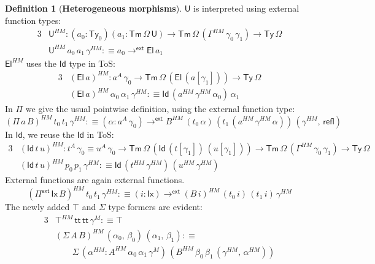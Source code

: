 \documentclass[12pt,a4paper,twoside,openany]{book}
\theoremstyle{remark}
\theoremstyle{definition}
\newtheorem{mydefinition}{Definition}
\theoremstyle{theorem}
\newcommand{\ms}[1]{\mathsf{#1}}
\newcommand{\refl}{\mathsf{refl}}
\newcommand{\Tm}{\mathsf{Tm}}
\newcommand{\Ty}{\mathsf{Ty}}
\newcommand{\U}{\mathsf{U}}
\newcommand{\El}{\mathsf{El}}
\newcommand{\Id}{\mathsf{Id}}
\renewcommand{\tt}{\mathsf{tt}}
\newcommand{\Pie}{\Pi^{\mathsf{ext}}}
\newcommand{\toe}{\to^{\ms{ext}}}
\newcommand{\defn}{:\equiv}
\begin{document}
\begin{mydefinition}[\textbf{Heterogeneous morphisms}]
\noindent $\U$ is interpreted using external function types:
\begin{alignat*}{3}
  & \U^{HM} : (a_0 : \Ty_0)(a_1 : \Tm\,\Omega\,\U) \to \Tm\,\Omega\,(\Gamma^{HM}\,\gamma_0\,\gamma_1)
  \to \Ty\,\Omega\\
  & \U^{HM}\,a_0\,a_1\,\gamma^{HM} \defn a_0 \toe \El\,a_1
\end{alignat*}
$\El^{HM}$ uses the $\Id$ type in ToS:
\begin{alignat*}{3}
  & (\El\,a)^{HM} : a^A\,\gamma_0 \to \Tm\,\Omega\,(\El\,(a[\gamma_1])) \to \Ty\,\Omega\\
  & (\El\,a)^{HM}\,\alpha_0\,\alpha_1\,\gamma^{HM} \defn \Id\,(a^{HM}\,\gamma^{HM}\,\alpha_0)\,\alpha_1
\end{alignat*}
In $\Pi$ we give the usual pointwise definition, using the external function type:
\[
  (\Pi\,a\,B)^{HM}\,t_0\,t_1\,\gamma^{HM} \defn (\alpha : a^A\,\gamma_0) \toe B^{HM}\,(t_0\,\alpha)\,(t_1\,(a^{HM}\,\gamma^{HM}\,\alpha))\,(\gamma^{HM},\,\refl)
\]
In $\Id$, we reuse the $\Id$ in ToS:
\begin{alignat*}{3}
  &(\Id\,t\,u)^{HM} : t^A\,\gamma_0 \equiv u^A\,\gamma_0 \to \Tm\,\Omega\,(\Id\,(t[\gamma_1])\,(u[\gamma_1]))
   \to \Tm\,\Omega\,(\Gamma^{HM}\,\gamma_0\,\gamma_1) \to \Ty\,\Omega\\
  &(\Id\,t\,u)^{HM}\,p_0\,p_1\,\gamma^{HM} \defn  \Id\,(t^{HM}\,\gamma^{HM})\,(u^{HM}\,\gamma^{HM})
\end{alignat*}
External functions are again external functions.
\[
  (\Pie\,\ms{Ix}\,B)^{HM}\,t_0\,t_1\,\gamma^{HM} \defn (i : \ms{Ix}) \toe (B\,i)^{HM}\,(t_0\,i)\,(t_1\,i)\,\gamma^{HM}
\]
The newly added $\top$ and $\Sigma$ type formers are evident:
\begin{alignat*}{3}
  &\top^{HM}\,\tt\,\tt\,\gamma^M \defn \top\\
  &(\Sigma\,A\,B)^{HM}\,(\alpha_0,\,\beta_0)\,(\alpha_1,\,\beta_1) \defn\\
  &\hspace{2em}\Sigma\,(\alpha^{HM} : A^{HM}\,\alpha_0\,\alpha_1\,\gamma^M)\,
          (B^{HM}\,\beta_0\,\beta_1\,(\gamma^{HM},\,\alpha^{HM}))
\end{alignat*}
\end{mydefinition}
\end{document}

